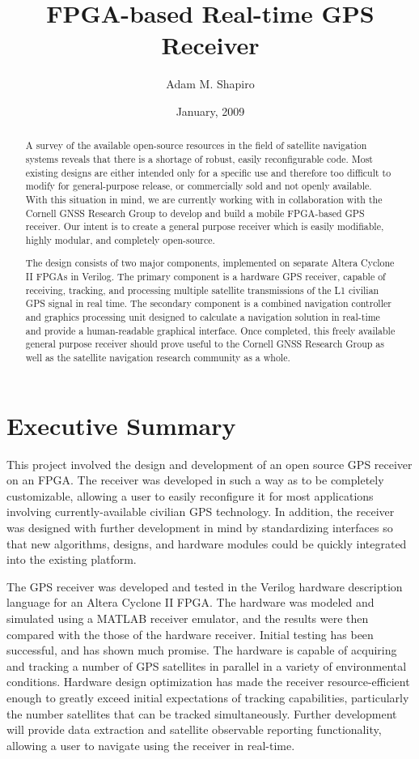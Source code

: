 \documentclass[12pt]{article}
\title{FPGA-based Real-time GPS Receiver}
\author{Adam M. Shapiro}
\date{January, 2009}
\begin{document}
\maketitle

\begin{abstract}
A survey of the available open-source resources in the field of satellite navigation 
systems reveals that there is a shortage of robust, easily reconfigurable code. Most existing 
designs are either intended only for a specific use and therefore too difficult to modify for general-purpose release, or commercially sold and not openly available. With this situation in mind, we are currently working with in collaboration with the Cornell GNSS Research Group to develop and build a mobile FPGA-based GPS receiver. Our intent is to create a general purpose receiver which is easily modifiable, highly modular, and completely open-source.

The design consists of two major components, implemented on separate Altera Cyclone II FPGAs in Verilog. The primary component is a hardware GPS receiver, capable of receiving, tracking, and processing multiple satellite transmissions of the L1 civilian GPS signal in real time. The secondary component is a combined navigation controller and graphics processing unit designed to calculate a navigation solution in real-time and provide a human-readable graphical interface. Once completed, this freely available general purpose receiver should prove useful to the Cornell GNSS Research Group as well as the satellite navigation research community as a whole.
\end{abstract}

\tableofcontents

\section*{Executive Summary}
This project involved the design and development of an open source GPS receiver on an FPGA. The receiver was developed in such a way as to be completely customizable, allowing a user to easily reconfigure it for most applications involving currently-available civilian GPS technology. In addition, the receiver was designed with further development in mind by standardizing interfaces so that new algorithms, designs, and hardware modules could be quickly integrated into the existing platform.

The GPS receiver was developed and tested in the Verilog hardware description language for an Altera Cyclone II FPGA. The hardware was modeled and simulated using a MATLAB receiver emulator, and the results were then compared with the those of the hardware receiver. Initial testing has been successful, and has shown much promise. The hardware is capable of acquiring and tracking a number of GPS satellites in parallel in a variety of environmental conditions. Hardware design optimization has made the receiver resource-efficient enough to greatly exceed initial expectations of tracking capabilities, particularly the number satellites that can be tracked simultaneously. Further development will provide data extraction and satellite observable reporting functionality, allowing a user to navigate using the receiver in real-time.
\end{document}
